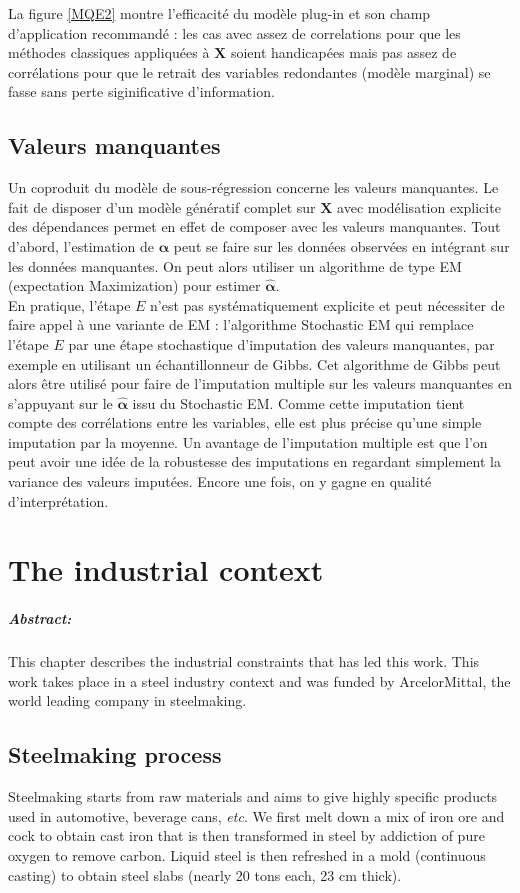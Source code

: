 \documentclass[12pt,a4paper]{report}
\begin{document}
	La figure \ref{MQE2} montre l'efficacité du modèle plug-in et son champ d'application recommandé : les cas avec assez de correlations pour que les méthodes classiques appliquées à $\boldsymbol{X}$ soient handicapées mais pas assez de corrélations pour que le retrait des variables redondantes (modèle marginal)  se fasse sans perte siginificative d'information.
		
	\section{Valeurs manquantes}
		Un coproduit du modèle de sous-régression concerne les valeurs manquantes. Le fait de disposer d'un modèle génératif complet sur $\boldsymbol{X}$ avec modélisation explicite des dépendances permet en effet de composer avec les valeurs manquantes. Tout d'abord, l'estimation de $\boldsymbol{\alpha}$ peut se faire sur les données observées en intégrant sur les données manquantes. On peut alors utiliser un algorithme de type EM (expectation Maximization) pour estimer $\hat{\boldsymbol{\alpha}}$.\\
		 
		 En pratique, l'étape $E$ n'est pas systématiquement explicite et peut nécessiter de faire appel à une variante de EM : l'algorithme Stochastic EM qui remplace l'étape $E$ par une étape stochastique d'imputation des valeurs manquantes, par exemple en utilisant un échantillonneur de Gibbs. Cet algorithme de Gibbs peut alors être utilisé pour faire de l'imputation multiple sur les valeurs manquantes en s'appuyant sur le $\hat{\boldsymbol{\alpha}}$ issu du Stochastic EM. Comme cette imputation tient compte des corrélations entre les variables, elle est plus précise qu'une simple imputation par la moyenne. Un avantage de l'imputation multiple est que l'on peut avoir une idée de la robustesse des imputations en regardant simplement la variance des valeurs imputées. Encore une fois, on y gagne en qualité d'interprétation.  
\chapter{The industrial context}
	\paragraph{Abstract:} This chapter describes the industrial constraints that has led this work. This work takes place in a steel industry context and was funded by ArcelorMittal, the world leading company in steelmaking. 
\section{Steelmaking process}
	Steelmaking starts from raw materials and aims to give highly specific products used in automotive, beverage cans, {\it etc}.
	We first melt down a mix of iron ore and cock to obtain cast iron that is then transformed in steel by addiction of pure oxygen to remove carbon. Liquid steel is then refreshed in a mold (continuous casting) to obtain steel slabs (nearly 20 tons each, 23 cm thick). \\
	
\end{document}
